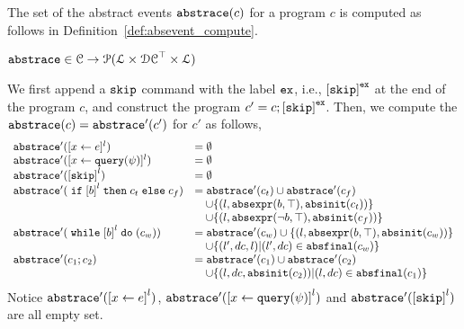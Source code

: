 The set of the abstract events $\mathtt{abs}{\mathtt{trace}}(c)$ for a program $c$
is computed as follows in Definition~\ref{def:absevent_compute}.
 \begin{defn}
 \label{def:absevent_compute}
 $\mathtt{abs}{\mathtt{trace}} \in \mathcal{C} \to \mathcal{P}( \mathcal{L} \times \mathcal{DC}^{\top} \times \mathcal{L} )$
 \end{defn}
 We first append a $\mathtt{skip}$ command with 
the label $\mathtt{ex}$, i.e., $\clabel{\eskip}^{\lex}$ at the end of the program $c$, and construct 
the program $c' = c;\clabel{\eskip}^{\lex}$.
Then, we compute the $\mathtt{abs}{\mathtt{trace}}(c) = \mathtt{abs}{\mathtt{trace}}'(c')$ for $c'$ as follows,
 {
 \[
 \begin{array}{ll}
 \absflow'(\clabel{\assign{x}{\expr}}{}^l) & = \emptyset \\
 \absflow'(\clabel{\assign{x}{\query(\qexpr)}}{}^l) & = \emptyset \\
 \absflow'(\clabel{\eskip}^{l}) & = \emptyset \\
 \absflow'(\eif \clabel{\bexpr}^{l} \ethen c_t \eelse c_f) & = \absflow'(c_t) \cup \absflow'(c_f)
 \\ & \quad 
 \cup \left\{(l, \absexpr(\bexpr, \top), \absinit(c_t) ) \right\}
 \\ & \quad 
 \cup \left\{ (l, \absexpr(\neg\bexpr, \top), \absinit(c_f)) \right\} \\
 \absflow'(\ewhile \clabel{\bexpr}^{l} \edo (c_w)) & = \absflow'(c_w) \cup \{(l, \absexpr(\bexpr, \top), \absinit(c_w)) \} 
 \\ & \quad 
 \cup \{(l', dc, l)| (l', dc) \in \absfinal(c_w) \} \\
 \absflow'(c_1 ; c_2) & = \absflow'(c_1) \cup \absflow'(c_2) 
 \\ & \quad 
 \cup \{ (l, dc, \absinit(c_2)) | (l, dc) \in \absfinal(c_1) \} \\
 \end{array}
 \]
 }
 Notice $\absflow'(\clabel{\assign{x}{\expr}}^{l})$, $\absflow'(\clabel{\assign{x}{\query(\qexpr)}}^{l})$ and $\absflow'(\clabel{\eskip}^{l})$ are all empty set. 
 

